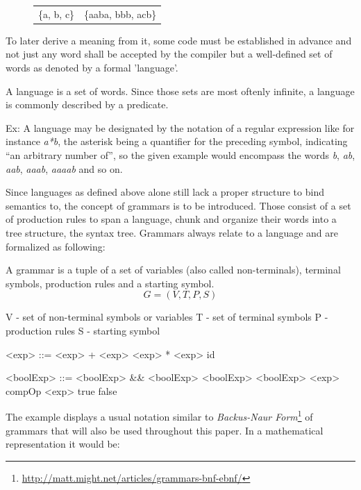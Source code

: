 \begin{figure}
	\begin{center}
	\begin{tabular}{c c}
		\{a, b, c\} & \{aaba, bbb, acb\}
	\end{tabular}
	\end{center}
\end{figure}

To later derive a meaning from it, some code must be established in advance and not just any word shall be accepted by the compiler but a well-defined set of words as denoted by a formal 'language'.

\begin{definition}
	A language is a set of words. Since those sets are most oftenly infinite, a language is commonly described by a predicate.
\end{definition}

Ex: A language may be designated by the notation of a regular expression like for instance \textit{a*b}, the asterisk being a quantifier for the preceding symbol, indicating ``an arbitrary number of'', so the given example would encompass the words \textit{b}, \textit{ab}, \textit{aab}, \textit{aaab}, \textit{aaaab} and so on.

Since languages as defined above alone still lack a proper structure to bind semantics to, the concept of grammars is to be introduced. Those consist of a set of production rules to span a language, chunk and organize their words into a tree structure, the syntax tree. Grammars always relate to a language and are formalized as following:

\begin{definition}
	A grammar is a tuple of a set of variables (also called non-terminals), terminal symbols, production rules and a starting symbol.
	\[G = (V, T, P, S)\]
	
	V - set of non-terminal symbols or variables
	T - set of terminal symbols
	P - production rules
	S - starting symbol
\end{definition}

\begin{grammar}
	<exp> ::= <exp> + <exp>
	\alt <exp> * <exp>
	\alt id

	<boolExp> ::= <boolExp> \&\& <boolExp>
	\alt <boolExp> \textbar\textbar <boolExp>
	\alt <exp> compOp <exp>
	\alt true
	\alt false
\end{grammar}

The example displays a usual notation similar to \textit{Backus-Naur Form}\footnote{\url{http://matt.might.net/articles/grammars-bnf-ebnf/}} of grammars that will also be used throughout this paper. In a mathematical representation it would be:


